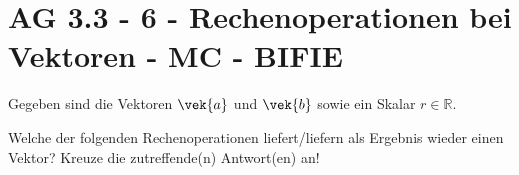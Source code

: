 \section{AG 3.3 - 6 - Rechenoperationen bei Vektoren - MC - BIFIE}

\begin{beispiel}[AG 3.3]{1} %
Gegeben sind die Vektoren $\vek{a}$ und $\vek{b}$ sowie ein Skalar $r\in\mathbb{R}$.

Welche der folgenden Rechenoperationen liefert/liefern als Ergebnis wieder einen Vektor? Kreuze die zutreffende(n) Antwort(en) an!
\end{beispiel}